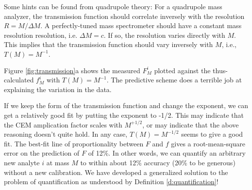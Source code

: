 Some hints can be found from quadrupole theory\cite{Douglas2009}: For a quadrupole mass analyzer, the transmission function should correlate inversely with the resolution $R = M / \Delta M$. A perfectly-tuned mass spectrometer should have a constant mass resolution resolution, i.e. $\Delta M = c$. If so, the resolution varies directly with $M$. This implies that the transmission function should vary inversely with $M$, i.e., $T(M)=M^{-1}$.

Figure \ref{fig:transmission}a shows the measured $F_M^i$ plotted against the thus-calculated $f_M^i$ with $T(M)=M^{-1}$. The predictive scheme does a terrible job at explaining the variation in the data.

If we keep the form of the transmission function and change the exponent, we can get a relatively good fit by putting the exponent to -1/2. This may indicate that the CEM amplication factor scales with $M^{+1/2}$, or may indicate that the above reasoning doesn't quite hold. In any case, $T(M)=M^{-1/2}$ seems to give a good fit. The best-fit line of proportionality between $F$ and $f$ gives a root-mean-square error on the prediction of $F$ of 12\%. In other words, we can quantify an arbitrary new analyte $i$ at mass $M$ to within about 12\% accuracy (20\% to be generous) without a new calibration. We have developed a generalized solution to the problem of quantification as understood by Definition \ref{d:quantification}!
\vspace{5mm}

